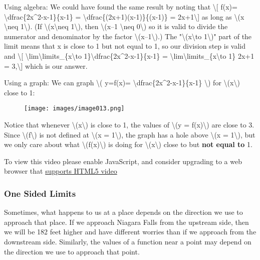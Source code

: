 {Using algebra:} We could have found the same result by noting that
\textbackslash{}{[} f(x)= \textbackslash{}dfrac\{2x\^{}2-x-1\}\{x-1\} =
\textbackslash{}dfrac\{(2x+1)(x-1)\}\{(x-1)\} = 2x+1\textbackslash{}{]}
as long as \textbackslash{}(x \textbackslash{}neq 1\textbackslash{}).
(If \textbackslash{}(x\textbackslash{}neq 1\textbackslash{}), then
\textbackslash{}(x--1 \textbackslash{}neq 0\textbackslash{}) so it is
valid to divide the numerator and denominator by the factor
\textbackslash{}(x--1\textbackslash{}).) The
"\textbackslash{}(x\textbackslash{}to 1\textbackslash{})" part of the
limit means that x is close to 1 but not equal to 1, so our division
step is valid and \textbackslash{}{[}
\textbackslash{}lim\textbackslash{}limits\_\{x\textbackslash{}to
1\}\textbackslash{}dfrac\{2x\^{}2-x-1\}\{x-1\} =
\textbackslash{}lim\textbackslash{}limits\_\{x\textbackslash{}to 1\}
2x+1 = 3,\textbackslash{}{]} which is our answer.

{Using a graph:} We can graph \textbackslash{}( y=f(x)=
\textbackslash{}dfrac\{2x\^{}2-x-1\}\{x-1\} \textbackslash{}) for
\textbackslash{}(x\textbackslash{}) close to 1:

\begin{figure}
\centering
\texttt{[image: images/image013.png]}
\caption{}
\end{figure}

Notice that whenever \textbackslash{}(x\textbackslash{}) is close to 1,
the values of \textbackslash{}(y = f(x)\textbackslash{}) are close to 3.
Since \textbackslash{}(f\textbackslash{}) is not defined at
\textbackslash{}(x = 1\textbackslash{}), the graph has a hole above
\textbackslash{}(x = 1\textbackslash{}), but we only care about what
\textbackslash{}(f(x)\textbackslash{}) is doing for
\textbackslash{}(x\textbackslash{}) close to but \textbf{not equal to}
1.

To view this video please enable JavaScript, and consider upgrading to a
web browser that \href{http://videojs.com/html5-video-support/}{supports
HTML5 video}

\hypertarget{one-sided-limits}{%
\subsubsection{One Sided Limits}\label{one-sided-limits}}

Sometimes, what happens to us at a place depends on the direction we use
to approach that place. If we approach Niagara Falls from the upstream
side, then we will be 182 feet higher and have different worries than if
we approach from the downstream side. Similarly, the values of a
function near a point may depend on the direction we use to approach
that point.

